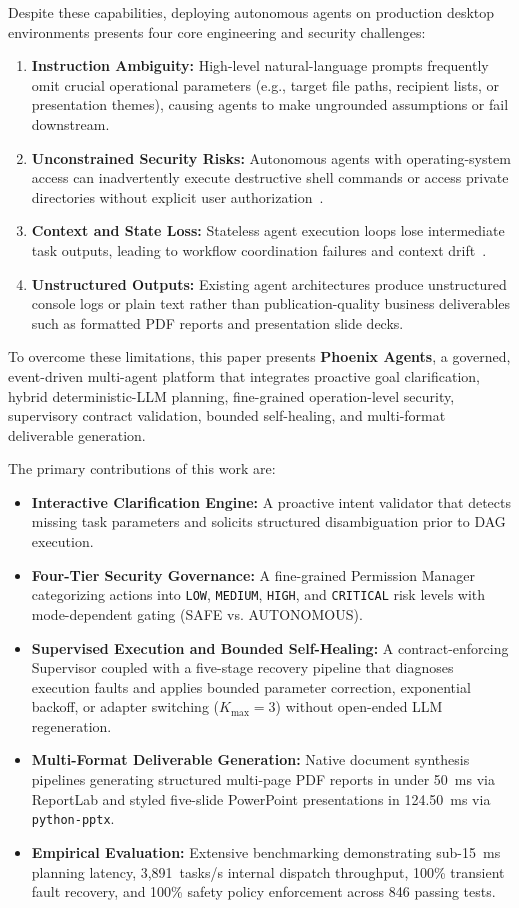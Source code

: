 \documentclass[conference]{IEEEtran}
\begin{document}
Despite these capabilities, deploying autonomous agents on production desktop environments presents four core engineering and security challenges:
\begin{enumerate}
    \item \textbf{Instruction Ambiguity:} High-level natural-language prompts frequently omit crucial operational parameters (e.g., target file paths, recipient lists, or presentation themes), causing agents to make ungrounded assumptions or fail downstream.
    \item \textbf{Unconstrained Security Risks:} Autonomous agents with operating-system access can inadvertently execute destructive shell commands or access private directories without explicit user authorization~\cite{bajoria2026}.
    \item \textbf{Context and State Loss:} Stateless agent execution loops lose intermediate task outputs, leading to workflow coordination failures and context drift~\cite{wang2026}.
    \item \textbf{Unstructured Outputs:} Existing agent architectures produce unstructured console logs or plain text rather than publication-quality business deliverables such as formatted PDF reports and presentation slide decks.
\end{enumerate}

To overcome these limitations, this paper presents \textbf{Phoenix Agents}, a governed, event-driven multi-agent platform that integrates proactive goal clarification, hybrid deterministic-LLM planning, fine-grained operation-level security, supervisory contract validation, bounded self-healing, and multi-format deliverable generation.

The primary contributions of this work are:
\begin{itemize}
    \item \textbf{Interactive Clarification Engine:} A proactive intent validator that detects missing task parameters and solicits structured disambiguation prior to DAG execution.
    \item \textbf{Four-Tier Security Governance:} A fine-grained Permission Manager categorizing actions into \texttt{LOW}, \texttt{MEDIUM}, \texttt{HIGH}, and \texttt{CRITICAL} risk levels with mode-dependent gating (SAFE vs. AUTONOMOUS).
    \item \textbf{Supervised Execution and Bounded Self-Healing:} A contract-enforcing Supervisor coupled with a five-stage recovery pipeline that diagnoses execution faults and applies bounded parameter correction, exponential backoff, or adapter switching ($K_{\text{max}}=3$) without open-ended LLM regeneration.
    \item \textbf{Multi-Format Deliverable Generation:} Native document synthesis pipelines generating structured multi-page PDF reports in under 50~ms via ReportLab and styled five-slide PowerPoint presentations in 124.50~ms via \texttt{python-pptx}.
    \item \textbf{Empirical Evaluation:} Extensive benchmarking demonstrating sub-15~ms planning latency, 3,891~tasks/s internal dispatch throughput, 100\% transient fault recovery, and 100\% safety policy enforcement across 846 passing tests.
\end{itemize}
\end{document}

